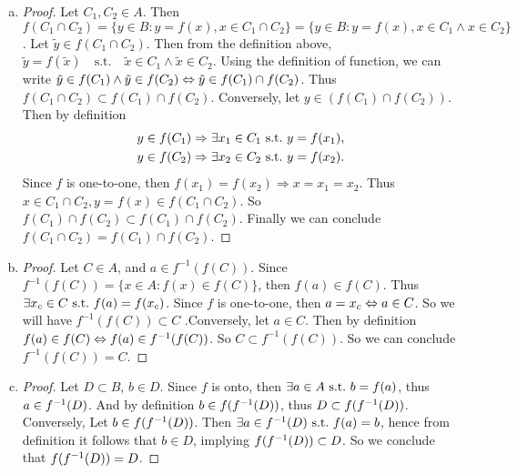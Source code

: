 \begin{ans}
	\begin{enumerate}[(a)]
		\item 
		\begin{proof}
			Let $C_1, C_2 \in A$. Then $f(C_1 \cap C_2) = \{ y \in B : y = f(x), x \in C_1 \cap C_2 \} = \{  y \in B : y = f(x), x \in C_1 \wedge x \in C_2 \}$. Let $\tilde{y} \in f(C_1 \cap C_2)$. Then from the definition above, $\tilde{y} = f(\tilde{x}) \quad \text{s.t.} \quad \tilde{x} \in C_1 \wedge \tilde{x} \in C_2 $. Using the definition of function, we can write $\tilde{y} \in f(C_1) \wedge \tilde{y} \in f(C_2) \Leftrightarrow \tilde{y} \in f(C_1) \cap f(C_2)$. Thus $f(C_1 \cap C_2) \subset f(C_1) \cap f(C_2)$. Conversely, let $y \in (f(C_1) \cap f(C_2))$. Then by definition
			\begin{align*}
				y \in f(C_1) \Rightarrow \exists x_1 \in C_1 \ \text{s.t.}\  y = f(x_1), \\
				y \in f(C_2) \Rightarrow \exists x_2 \in C_2 \ \text{s.t.}\  y = f(x_2). 
			\end{align*}
			Since $f$ is one-to-one, then $f(x_1) = f(x_2) \Rightarrow x = x_1 = x_2$. Thus $x \in C_1 \cap C_2, y = f(x) \in f(C_1 \cap C_2)$. So $f(C_1) \cap f(C_2) \subset f(C_1) \cap f(C_2)$. Finally we can conclude $f(C_1 \cap C_2) = f(C_1) \cap f(C_2)$.
		\end{proof}
		\item 
		\begin{proof}
			Let $C \in A$, and $a \in f^{-1}(f(C))$. Since $f^{-1}(f(C)) = \{ x \in A: f(x) \in f(C) \}$, then $f(a) \in f(C)$. Thus $\exists x_c \in C \ \text{s.t.}\  f(a) = f(x_c)$. Since $f$ is one-to-one, then $a = x_c \Leftrightarrow a \in C$. So we will have $f^{-1}(f(C)) \subset C$ .Conversely, let $a \in C$. Then by definition $f(a) \in f(C) \Leftrightarrow f(a) \in f^{-1}(f(C))$. So $C \subset f^{-1}(f(C)) $. So we can conclude $f^{-1}(f(C))=C$.
		\end{proof}
		\item 
		\begin{proof}
			Let $D \subset B$, $b \in D$. Since $f$ is onto, then $\exists a \in A \ \text{s.t.}\  b = f(a)$, thus $a \in f^{-1}(D)$. And by definition $b \in f(f^{-1}(D))$, thus $D \subset f(f^{-1}(D))$. Conversely, Let $b \in f(f^{-1}(D))$. Then $\exists a \in f^{-1}(D) \ \text{s.t.}\  f(a)=b $, hence from definition it follows that $b \in D$, implying $f(f^{-1}(D)) \subset D$. So we conclude that $f(f^{-1}(D)) = D$.
		\end{proof}
	\end{enumerate}
\end{ans}
\newpage

